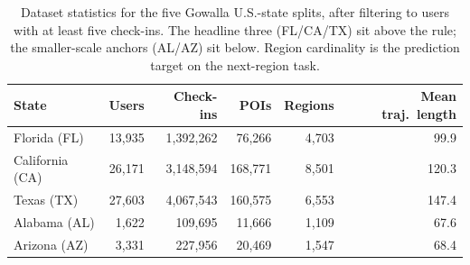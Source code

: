 \begin{table}[t]
\centering
\caption{Dataset statistics for the five Gowalla \cite{cho2011gowalla} U.S.-state splits, after filtering to users with at least five check-ins. The headline three (FL/CA/TX) sit above the rule; the smaller-scale anchors (AL/AZ) sit below. Region cardinality is the prediction target on the next-region task.}
\label{tab:datasets}
\footnotesize
\renewcommand{\arraystretch}{1.1}
\begin{tabular}{l r r r r r}
\toprule
State & Users & Check-ins & POIs & Regions & Mean traj.\ length \\
\midrule
Florida (FL)    & 13{,}935 & 1{,}392{,}262 &  76{,}266 & 4{,}703 &  99.9 \\
California (CA) & 26{,}171 & 3{,}148{,}594 & 168{,}771 & 8{,}501 & 120.3 \\
Texas (TX)      & 27{,}603 & 4{,}067{,}543 & 160{,}575 & 6{,}553 & 147.4 \\
\midrule
Alabama (AL)    &  1{,}622 &   109{,}695   &  11{,}666 & 1{,}109 &  67.6 \\
Arizona (AZ)    &  3{,}331 &   227{,}956   &  20{,}469 & 1{,}547 &  68.4 \\
\bottomrule
\end{tabular}
\end{table}
